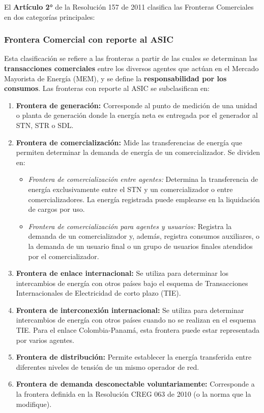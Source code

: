 \documentclass[a5paper]{book}%
\begin{document}
El \textbf{Artículo 2°} de la Resolución 157 de 2011 clasifica las Fronteras Comerciales en dos categorías principales:

\subsubsection{Frontera Comercial con reporte al ASIC}

Esta clasificación se refiere a las fronteras a partir de las cuales se determinan las \textbf{transacciones comerciales} entre los diversos agentes que actúan en el Mercado Mayorista de Energía (MEM), y se define la \textbf{responsabilidad por los consumos}. Las fronteras con reporte al ASIC se subclasifican en:

\begin{enumerate}
	\item \textbf{Frontera de generación:} Corresponde al punto de medición de una unidad o planta de generación donde la energía neta es entregada por el generador al STN, STR o SDL.
	\item \textbf{Frontera de comercialización:} Mide las transferencias de energía que permiten determinar la demanda de energía de un comercializador. Se dividen en:
	\begin{itemize}
	\item \textit{Frontera de comercialización entre agentes:} Determina la transferencia de energía exclusivamente entre el STN y un comercializador o entre comercializadores. La energía registrada puede emplearse en la liquidación de cargos por uso.
	\item \textit{Frontera de comercialización para agentes y usuarios:} Registra la demanda de un comercializador y, además, registra consumos auxiliares, o la demanda de un usuario final o un grupo de usuarios finales atendidos por el comercializador.
	\end{itemize}
	\item \textbf{Frontera de enlace internacional:} Se utiliza para determinar los intercambios de energía con otros países bajo el esquema de Transacciones Internacionales de Electricidad de corto plazo (TIE).
	\item \textbf{Frontera de interconexión internacional:} Se utiliza para determinar intercambios de energía con otros países cuando no se realizan en el esquema TIE. Para el enlace Colombia-Panamá, esta frontera puede estar representada por varios agentes.
	\item \textbf{Frontera de distribución:} Permite establecer la energía transferida entre diferentes niveles de tensión de un mismo operador de red.
	\item \textbf{Frontera de demanda desconectable voluntariamente:} Corresponde a la frontera definida en la Resolución CREG 063 de 2010 (o la norma que la modifique).
\end{enumerate}
\end{document}
